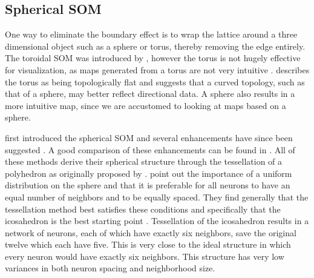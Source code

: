 \documentclass[10pt,titlepage]{article}
\begin{document}
\subsection{Spherical SOM}
One way to eliminate the boundary effect is to wrap the lattice around a three
dimensional object such as a sphere or torus, thereby removing the edge
entirely. The toroidal SOM was introduced by \cite{li1993}, however the torus is
not hugely effective for visualization, as maps generated from a torus are not
very intuitive \citep{ito2000,wu2006}.  \cite{ritter99} describes the torus as
being topologically flat and suggests that a curved topology, such as that of a
sphere, may better reflect directional data.  A sphere also results in a more
intuitive map, since we are accustomed to looking at maps based on a sphere.

\cite{ritter99} first introduced the spherical SOM and several enhancements have
since been suggested \citep{boudjemai2003,sangole03,Nishio:2006fk,wu2006}.  A
good comparison of these enhancements can be found in \cite{wu2006}.  All of
these methods derive their spherical structure through the tessellation of a
polyhedron as originally proposed by \cite{ritter99}.  \cite{wu2006} point
out the importance of a uniform distribution on the sphere and that it is
preferable for all neurons to have an equal number of neighbors and to be
equally spaced.  They find generally that the tessellation method best satisfies
these conditions and specifically that the icosahedron is the best starting
point \citep{wu2005}. Tessellation of the icosahedron results in a network of
neurons, each of which have exactly six neighbors, save the original twelve
which each have five.  This is very close to the ideal structure in which every
neuron would have exactly six neighbors.  This structure has very low variances
in both neuron spacing and neighborhood size.
\end{document}

